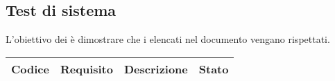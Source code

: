 \subsection{Test di sistema}
L'obiettivo dei  è dimostrare che i  elencati nel documento \AdR{} \versAdR{} vengano rispettati.


{
    \setlength{\freewidth}{\dimexpr\textwidth-8\tabcolsep}
    \renewcommand{\arraystretch}{1.5}
    \centering
    \setlength{\aboverulesep}{0pt}
    \setlength{\belowrulesep}{0pt}
    \begin{longtable}{C{.20\freewidth} C{.20\freewidth} C{.50\freewidth} C{.10\freewidth}}
        \toprule 
        \textbf{Codice} & \textbf{Requisito} & \textbf{Descrizione} & \textbf{Stato} \\
        \toprule
        \endhead


\end{longtable}}
